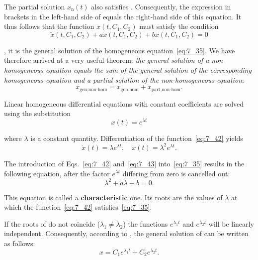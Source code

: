 The partial solution $x_{\text{n}}(t)$ also satisfies . Consequently, the expression in brackets in the left-hand side of  equals the right-hand side of this equation. It thus follows that the function $x(t, C_1, C_2)$ must satisfy the condition
\begin{equation*}
	\ddot{x}(t, C_1, C_2) + a\dot{x}(t, C_1, C_2) + bx(t, C_1, C_2) = 0
\end{equation*}

\noindent
\ie, it is the general solution of the homogeneous equation~\eqref{eq:7_35}. We have therefore arrived at a very useful theorem: \textit{the general solution of a non-homogeneous equation equals the sum of the general solution of the corresponding homogeneous equation and a partial solution of the non-homogeneous equation}:
\begin{equation}\label{eq:7_41}
	x_{\text{gen,non-hom}} = x_{\text{gen,hom}} + x_{\text{part,non-hom}}.
\end{equation}

\noindent
Linear homogeneous differential equations with constant coefficients are solved using the substitution
\begin{equation}\label{eq:7_42}
	x(t) = e^{\lambda t}
\end{equation}

\noindent
where $\lambda$ is a constant quantity. Differentiation of the function~\eqref{eq:7_42} yields
\begin{equation}\label{eq:7_43}
	\dot{x}(t) = \lambda e^{\lambda t},\quad \ddot{x}(t) = \lambda^2 e^{\lambda t}.
\end{equation}

\noindent
The introduction of Eqs.~\eqref{eq:7_42} and~\eqref{eq:7_43} into~\eqref{eq:7_35} results in the following equation, after the factor $e^{\lambda t}$ differing from zero is cancelled out:
\begin{equation}\label{eq:7_44}
	\lambda^2 + a\lambda + b = 0.
\end{equation}

\noindent
This equation is called a \textbf{characteristic} one. Its roots are the values of $\lambda$ at which the function~\eqref{eq:7_42} satisfies~\eqref{eq:7_35}.

If the roots of  do not coincide ($\lambda_1\neq\lambda_2$) the functions $e^{\lambda_1 t}$ and $e^{\lambda_2 t}$ will be linearly independent. Consequently, according to , the general solution of  can be written as follows:
\begin{equation}\label{eq:7_45}
	x = C_1 e^{\lambda_1 t} + C_2 e^{\lambda_2 t}.
\end{equation}

